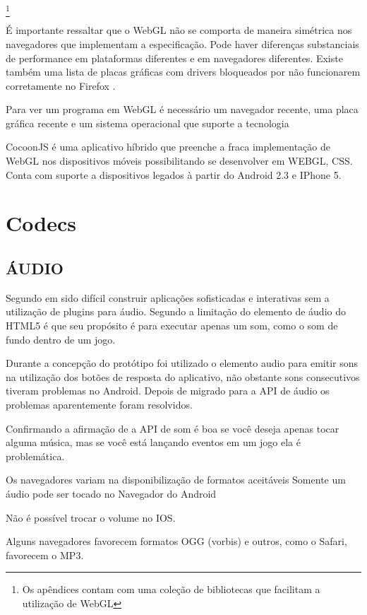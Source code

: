 \footnote{Os apêndices contam com uma coleção de bibliotecas que facilitam a utilização de WebGL}

É importante ressaltar que o WebGL não se comporta de maneira
simétrica nos navegadores que implementam a especificação. Pode haver
diferenças substanciais de performance em plataformas diferentes e em
navegadores diferentes. Existe também uma lista de placas gráficas
com drivers bloqueados por não funcionarem corretamente no Firefox
\autocite[pp.42]{3daps}.

Para ver um programa em WebGL é necessário um navegador recente, uma
placa gráfica recente e um sistema operacional que suporte a tecnologia
\autocite{html5mostwanted}

CocoonJS é uma aplicativo híbrido que preenche a fraca implementação
de WebGL nos dispositivos móveis possibilitando se desenvolver em
WEBGL, CSS. Conta com suporte a dispositivos legados à partir do
Android 2.3 e IPhone 5.

\section{Codecs}

\subsection{ÁUDIO}

Segundo \cite{browserGamesTechnologyAndFuture} em sido difícil
construir aplicações sofisticadas e interativas sem a utilização de
plugins para áudio.
Segundo \cite{html5mostwanted} a limitação do elemento de áudio do
HTML5 é que seu propósito é para executar apenas um som, como o som
de fundo dentro de um jogo.

Durante a concepção do protótipo foi utilizado o elemento audio
para emitir sons na utilização dos botões de resposta do aplicativo, 
não obstante sons consecutivos tiveram problemas no Android. 
Depois de migrado para a API  de áudio os problemas aparentemente foram 
resolvidos. 

Confirmando a afirmação de \cite{html5mostwanted} a API de som é
boa se você deseja apenas tocar alguma música, mas se você está
lançando eventos em um jogo ela é problemática.

Os navegadores variam na disponibilização de formatos aceitáveis
Somente um áudio pode ser tocado no Navegador do Android

Não é possível trocar o volume no IOS.

Alguns navegadores favorecem formatos OGG (vorbis) e outros, como o
Safari, favorecem o MP3.

